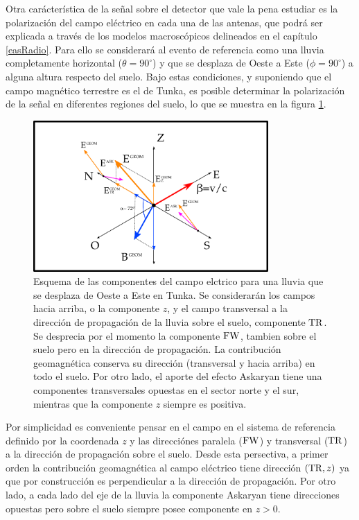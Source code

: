 	Otra car\'acter\'istica de la se\~nal sobre el detector que vale la pena estudiar es la polarizaci\'on del campo el\'ectrico en cada una de las antenas, que podr\'a ser explicada a trav\'es de los modelos macrosc\'opicos delineados en el cap\'itulo \ref{easRadio}.
	Para ello se considerar\'a al evento de referencia como una lluvia completamente horizontal ($\theta=90^\circ$) y que se desplaza de Oeste a Este ($\phi=90^\circ$) a alguna altura respecto del suelo.
	Bajo estas condiciones, y suponiendo que el campo magn\'etico terrestre es el de Tunka, es posible determinar la polarizaci\'on de la se\~nal en diferentes regiones del suelo, lo que se muestra en la figura \ref{fig:malField}.
	\begin{figure}[ht!]
		\centering
		\includegraphics[width=0.8\textwidth]{./fig/simulacionRadio/malField}
		\caption{\label{fig:malField}
		Esquema de las componentes del campo elctrico para una lluvia que se desplaza de Oeste a Este en Tunka. Se considerarán los campos hacia arriba, o la componente $z$, y el campo transversal a la dirección de propagación de la lluvia sobre el suelo, componente ${\rm TR}$. Se desprecia por el momento la componente ${\rm FW}$, tambien sobre el suelo pero en la dirección de propagación. La contribución geomagnética conserva su dirección (transversal y hacia arriba) en todo el suelo. Por otro lado, el aporte del efecto Askaryan tiene una componentes transversales opuestas en el sector norte y el sur, mientras que la componente $z$ siempre es positiva.
		}
	\end{figure}
	
	Por simplicidad es conveniente pensar en el campo en el sistema de referencia definido por la coordenada $z$ y las direcciónes paralela (${\rm FW}$) y transversal (${\rm TR}$) a la dirección de propagación sobre el suelo.
	Desde esta persectiva, a primer orden la contribución geomagnética al campo eléctrico tiene dirección $({\rm TR},z)$ ya que por construcción es perpendicular a la dirección de propagación.
	Por otro lado, a cada lado del eje de la lluvia la componente Askaryan tiene direcciones opuestas pero sobre el suelo siempre posee componente en $z>0$.
	

